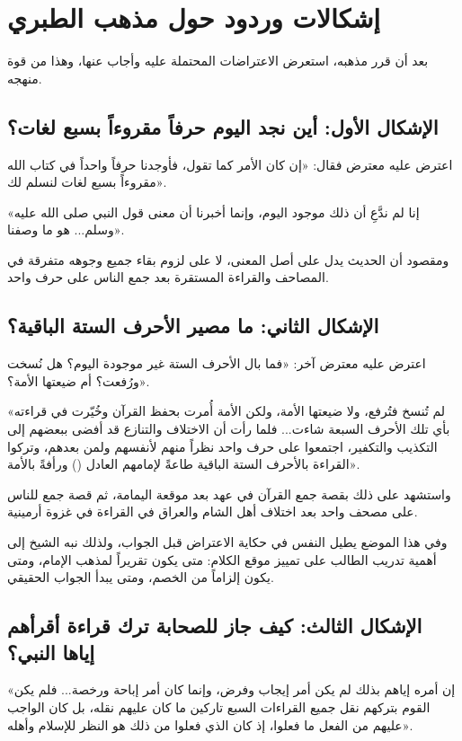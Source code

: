 \section{إشكالات وردود حول مذهب الطبري}
بعد أن قرر  مذهبه، استعرض الاعتراضات المحتملة عليه وأجاب عنها، وهذا من قوة منهجه.

\subsection{الإشكال الأول: أين نجد اليوم حرفاً مقروءاً بسبع لغات؟}
اعترض عليه معترض فقال: «إن كان الأمر كما تقول، فأوجدنا حرفاً واحداً في كتاب الله مقروءاً بسبع لغات لنسلم لك».

 «إنا لم ندَّعِ أن ذلك موجود اليوم، وإنما أخبرنا أن معنى قول النبي صلى الله عليه وسلم... هو ما وصفنا».

ومقصود  أن الحديث يدل على أصل المعنى، لا على لزوم بقاء جميع وجوهه متفرقة في المصاحف والقراءة المستقرة بعد جمع الناس على حرف واحد.

\subsection{الإشكال الثاني: ما مصير الأحرف الستة الباقية؟}
اعترض عليه معترض آخر: «فما بال الأحرف الستة غير موجودة اليوم؟ هل نُسخت ورُفعت؟ أم ضيعتها الأمة؟».

 «لم تُنسخ فتُرفع، ولا ضيعتها الأمة، ولكن الأمة أُمرت بحفظ القرآن وخُيّرت في قراءته بأي تلك الأحرف السبعة شاءت... فلما رأت أن الاختلاف والتنازع قد أفضى ببعضهم إلى التكذيب والتكفير، اجتمعوا على حرف واحد نظراً منهم لأنفسهم ولمن بعدهم، وتركوا القراءة بالأحرف الستة الباقية طاعةً لإمامهم العادل () ورأفةً بالأمة».

واستشهد على ذلك بقصة جمع القرآن في عهد  بعد موقعة اليمامة، ثم قصة جمع  للناس على مصحف واحد بعد اختلاف أهل الشام والعراق في القراءة في غزوة أرمينية.

وفي هذا الموضع يطيل  النفس في حكاية الاعتراض قبل الجواب، ولذلك نبه الشيخ إلى أهمية تدريب الطالب على تمييز موقع الكلام: متى يكون تقريراً لمذهب الإمام، ومتى يكون إلزاماً من الخصم، ومتى يبدأ الجواب الحقيقي.

\subsection{الإشكال الثالث: كيف جاز للصحابة ترك قراءة أقرأهم إياها النبي؟}
 «إن أمره إياهم بذلك لم يكن أمر إيجاب وفرض، وإنما كان أمر إباحة ورخصة... فلم يكن القوم بتركهم نقل جميع القراءات السبع تاركين ما كان عليهم نقله، بل كان الواجب عليهم من الفعل ما فعلوا، إذ كان الذي فعلوا من ذلك هو النظر للإسلام وأهله».

